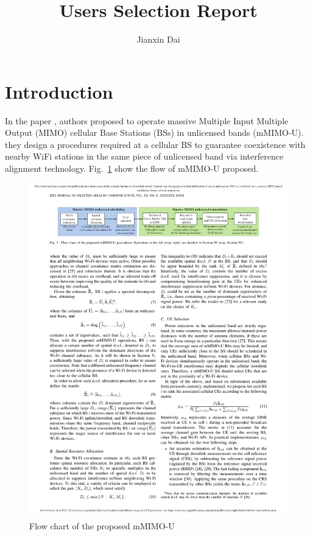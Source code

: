 \documentclass[12pt, onecolumn]{IEEEtran}
\author{Jianxin Dai\\
}
\title{Users Selection Report }
\begin{document}
\maketitle


\section{Introduction}

In the paper \cite{geraci2017operating}, authors proposed to operate massive Multiple Input Multiple Output (MIMO) cellular Base Stations (BSs) in unlicensed bands (mMIMO-U). they design a procedures required at a cellular BS to guarantee coexistence with nearby WiFi stations in the same piece of unlicensed band via interference alignment technology.  Fig.~\ref{FIG:mMIMO} show the flow of mMIMO-U  proposed.
\begin{figure}[H]
    \centering\includegraphics[width=1\columnwidth]{mMIMO.pdf}
    \caption{ Flow chart of the proposed mMIMO-U}\label{FIG:mMIMO}
\end{figure}
\end{document}
